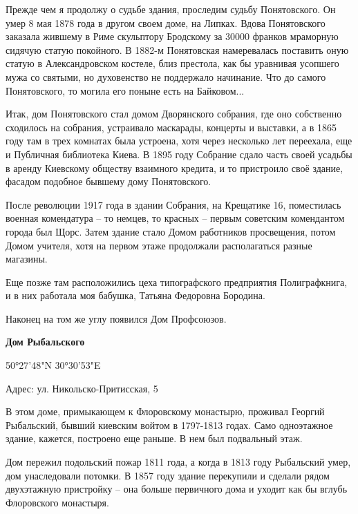 Прежде чем я продолжу о судьбе здания, проследим судьбу Понятовского. Он умер 8 мая 1878 года в другом своем доме, на Липках. Вдова Понятовского заказала жившему в Риме скульптору Бродскому за 30000 франков мраморную сидячую статую покойного. В 1882-м Понятовская намеревалась поставить оную статую в Александровском костеле, близ престола, как бы уравнивая усопшего мужа со святыми, но духовенство не поддержало начинание. Что до самого Понятовского, то могила его поныне есть на Байковом...

Итак, дом Понятовского стал домом Дворянского собрания, где оно собственно сходилось на собрания, устраивало маскарады, концерты и выставки, а в 1865 году там в трех комнатах была устроена, хотя через несколько лет переехала, еще и Публичная библиотека Киева. В 1895 году Собрание сдало часть своей усадьбы в аренду Киевскому обществу взаимного кредита, и то пристроило своё здание, фасадом подобное бывшему дому Понятовского. 

После революции 1917 года в здании Собрания, на Крещатике 16, поместилась военная комендатура – то немцев, то красных – первым советским комендантом города был Щорс. Затем здание стало Домом работников просвещения, потом Домом учителя, хотя на первом этаже продолжали располагаться разные магазины.

Еще позже там расположились цеха типографского предприятия Полиграфкнига, и в них работала моя бабушка, Татьяна Федоровна Бородина.

Наконец на том же углу появился Дом Профсоюзов.\\

\medskip


\textbf{Дом Рыбальского}

50°27'48"N  30°30'53"E

Адрес: ул. Никольско-Притисская, 5

В этом доме, примыкающем к Флоровскому монастырю, проживал Георгий Рыбальский, бывший киевским войтом в 1797-1813 годах. Само одноэтажное здание, кажется, построено еще раньше. В нем был подвальный этаж.

Дом пережил подольский пожар 1811 года, а когда в 1813 году Рыбальский умер, дом унаследовали потомки. В 1857 году здание перекупили и сделали рядом двухэтажную пристройку – она больше первичного дома и уходит как бы вглубь Флоровского монастыря.

